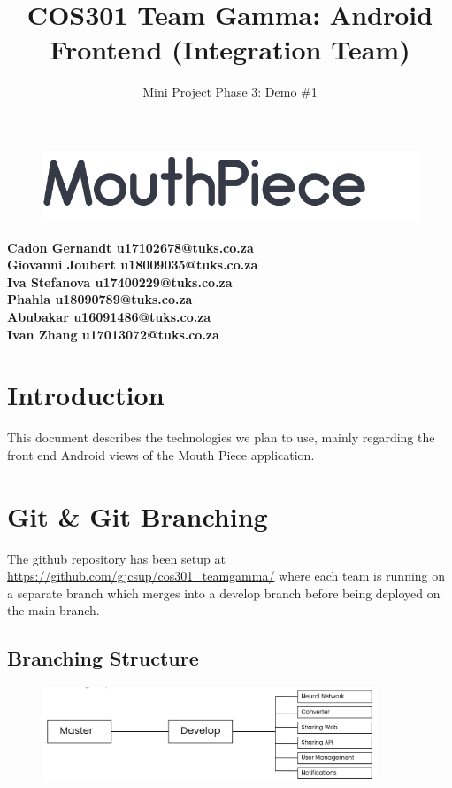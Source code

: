\documentclass{article}
\begin{document}
\title{COS301 Team Gamma: Android Frontend (Integration Team)}
\begin{figure}
    \centering
    \includegraphics[width=\textwidth]{logo.png}
\end{figure}
\date{Mini Project Phase 3: Demo \#1}

\maketitle

\begin{center}
\textbf{
Cadon Gernandt  u17102678@tuks.co.za \\
Giovanni Joubert    u18009035@tuks.co.za \\
Iva Stefanova   u17400229@tuks.co.za \\
Phahla u18090789@tuks.co.za \\
Abubakar u16091486@tuks.co.za \\
Ivan Zhang u17013072@tuks.co.za}
\end{center}

\newpage

\section{Introduction}
This document describes the technologies we plan to use, mainly regarding the front end Android views of the Mouth Piece application.


\section{Git \& Git Branching}
The github repository has been setup at \url{https://github.com/gjcsup/cos301_teamgamma/} where each team is running on a separate branch which merges into a develop branch before being deployed on the main branch.
\subsection{Branching Structure}
\begin{figure}[h]
    \centering
    \includegraphics[width=10cm]{branches.png}
\end{figure}
\end{document}

